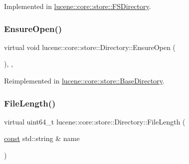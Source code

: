 Implemented in \mbox{\hyperlink{classlucene_1_1core_1_1store_1_1FSDirectory_a73d5bc12c68a2d5367d63c3256657a6a}{lucene\+::core\+::store\+::\+F\+S\+Directory}}.

\mbox{\label{classlucene_1_1core_1_1store_1_1Directory_a908bb5ccea0c5fee6d27eedcca686a9f}} 
\subsubsection{\texorpdfstring{Ensure\+Open()}{EnsureOpen()}}
{\footnotesize\ttfamily virtual void lucene\+::core\+::store\+::\+Directory\+::\+Ensure\+Open (\begin{DoxyParamCaption}{ }\end{DoxyParamCaption})\hspace{0.3cm}{\ttfamily [inline]}, {\ttfamily [protected]}, {\ttfamily [virtual]}}



Reimplemented in \mbox{\hyperlink{classlucene_1_1core_1_1store_1_1BaseDirectory_ae98262cc7ef9b3285ffe789eaa72e82a}{lucene\+::core\+::store\+::\+Base\+Directory}}.

\mbox{\label{classlucene_1_1core_1_1store_1_1Directory_a8a3db6f51db917f0cbec6e28ac9c685e}} 
\subsubsection{\texorpdfstring{File\+Length()}{FileLength()}}
{\footnotesize\ttfamily virtual uint64\+\_\+t lucene\+::core\+::store\+::\+Directory\+::\+File\+Length (\begin{DoxyParamCaption}\item[{\mbox{\hyperlink{ZlibCrc32_8h_a2c212835823e3c54a8ab6d95c652660e}{const}} std\+::string \&}]{name }\end{DoxyParamCaption})\hspace{0.3cm}{\ttfamily [pure virtual]}}



